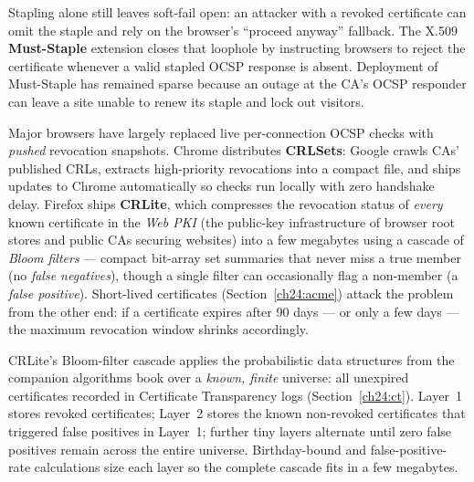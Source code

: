 Stapling alone still leaves soft-fail open: an attacker with a revoked certificate can omit the staple and rely on the browser's ``proceed anyway'' fallback. The X.509 \textbf{Must-Staple} extension closes that loophole by instructing browsers to reject the certificate whenever a valid stapled OCSP response is absent. Deployment of Must-Staple has remained sparse because an outage at the CA's OCSP responder can leave a site unable to renew its staple and lock out visitors.

\begin{applicationbox}
Major browsers have largely replaced live per-connection OCSP checks with \emph{pushed} revocation snapshots. Chrome distributes \textbf{CRLSets}: Google crawls CAs' published CRLs, extracts high-priority revocations into a compact file, and ships updates to Chrome automatically so checks run locally with zero handshake delay. Firefox ships \textbf{CRLite}, which compresses the revocation status of \emph{every} known certificate in the \emph{Web PKI} (the public-key infrastructure of browser root stores and public CAs securing websites) into a few megabytes using a cascade of \emph{Bloom filters} --- compact bit-array set summaries that never miss a true member (no \emph{false negatives}), though a single filter can occasionally flag a non-member (a \emph{false positive}). Short-lived certificates (Section~\ref{ch24:acme}) attack the problem from the other end: if a certificate expires after 90 days --- or only a few days --- the maximum revocation window shrinks accordingly.
\end{applicationbox}

\begin{connectionbox}
CRLite's Bloom-filter cascade applies the probabilistic data structures from the companion algorithms book over a \emph{known, finite} universe: all unexpired certificates recorded in Certificate Transparency logs (Section~\ref{ch24:ct}). Layer~1 stores revoked certificates; Layer~2 stores the known non-revoked certificates that triggered false positives in Layer~1; further tiny layers alternate until zero false positives remain across the entire universe. Birthday-bound and false-positive-rate calculations size each layer so the complete cascade fits in a few megabytes.
\end{connectionbox}

